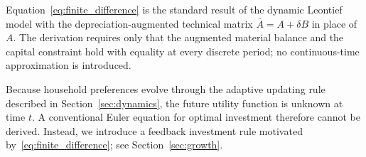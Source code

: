 \begin{remark}
    Equation~\eqref{eq:finite_difference} is the standard result of
    the dynamic Leontief model with the depreciation-augmented
    technical matrix $\bar{A} = A + \delta B$ in place of $A$.  The
    derivation requires only that the augmented material balance and
    the capital constraint hold with equality at every discrete period;
    no continuous-time approximation is introduced.
\end{remark}

\begin{remark}
    Because household preferences evolve through the adaptive updating
    rule described in Section~\ref{sec:dynamics}, the future utility
    function is unknown at time $t$. A conventional Euler equation for
    optimal investment therefore cannot be derived. Instead, we
    introduce a feedback investment rule motivated
    by~\eqref{eq:finite_difference}; see Section~\ref{sec:growth}.
\end{remark}